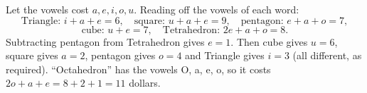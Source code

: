 Let the vowels cost $a,e,i,o,u$. Reading off the vowels of each word:
\[
\text{Triangle: } i+a+e=6,\quad \text{square: } u+a+e=9,\quad \text{pentagon: } e+a+o=7,
\]
\[
\text{cube: } u+e=7,\quad \text{Tetrahedron: } 2e+a+o=8 .
\]
Subtracting pentagon from Tetrahedron gives $e=1$. Then cube gives $u=6$, square gives $a=2$, pentagon gives $o=4$ and Triangle gives $i=3$ (all different, as required). ``Octahedron'' has the vowels O, a, e, o, so it costs $2o+a+e=8+2+1=\boxed{11}$ dollars.
